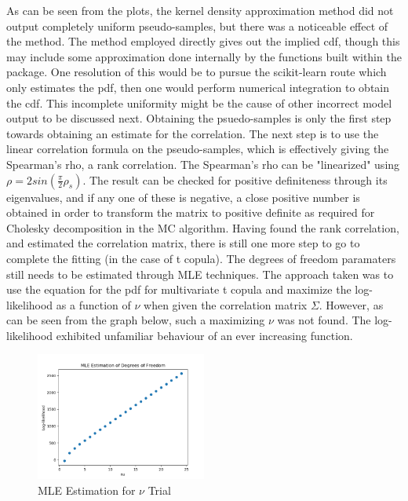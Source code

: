 \documentclass[a4paper,12pt]{article}
\begin{document}
As can be seen from the plots, the kernel density approximation method did not output completely uniform pseudo-samples, but there was a noticeable effect of the method. The method employed directly gives out the implied cdf, though this may include some approximation done internally by the functions built within the package. One resolution of this would be to pursue the scikit-learn route which only estimates the pdf, then one would perform numerical integration to obtain the cdf. This incomplete uniformity might be the cause of other incorrect model output to be discussed next. Obtaining the psuedo-samples is only the first step towards obtaining an estimate for the correlation. The next step is to use the linear correlation formula on the pseudo-samples, which is effectively giving the Spearman's rho, a rank correlation. The Spearman's rho can be "linearized" using $\rho = 2sin\left( \frac{\pi}{2}\rho_s\right)$. The result can be checked for positive definiteness through its eigenvalues, and if any one of these is negative, a close positive number is obtained in order to transform the matrix to positive definite as required for Cholesky decomposition in the MC algorithm.
\newline
Having found the rank correlation, and estimated the correlation matrix, there is still one more step to go to complete the fitting (in the case of t copula). The degrees of freedom paramaters still needs to be estimated through MLE techniques. The approach taken was to use the equation for the pdf for multivariate t copula and maximize the log-likelihood as a function of $\nu$ when given the correlation matrix $\Sigma$. However, as can be seen from the graph below, such a maximizing $\nu$ was not found. The log-likelihood exhibited unfamiliar behaviour of an ever increasing function.

\begin{figure}[h]

\centering
\includegraphics[width=0.5\textwidth]{mle_approximation_df}
\caption{MLE Estimation for $\nu$ Trial}
\label{image-mle}

\end{figure} 
 
\end{document}
